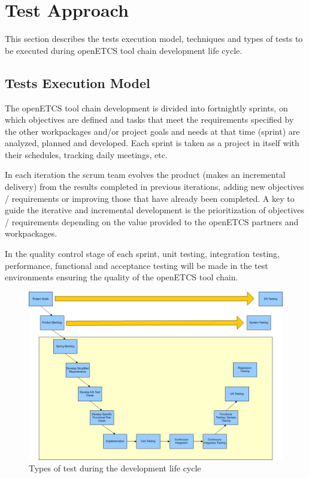 \section{Test Approach}
\label{sec:test_stra}

This section describes the tests execution model, techniques and types of tests to be executed during openETCS tool chain development life cycle.

\subsection{Tests Execution Model}
The openETCS tool chain development is divided into  fortnightly sprints, on which objectives are defined and tasks that meet the requirements specified by the other workpackages and/or project goals and needs at that time (sprint) are analyzed, planned and developed. Each sprint is taken as a project in itself with their schedules, tracking daily meetings, etc.

In each iteration the scrum team evolves the product (makes an incremental delivery) from the results completed in previous iterations, adding new objectives / requirements or improving those that have already been completed. A key to guide the iterative and incremental development is the prioritization of objectives / requirements depending on the value provided to the openETCS partners and workpackages.

In the quality control stage of each sprint, unit testing, integration testing, performance, functional and acceptance testing will be made in the test environments ensuring the quality of the openETCS tool chain.

\begin{figure}[H]
\includegraphics[width=\textwidth]{types_test}
\caption{\label{fig:types} Types of test during the development life cycle} 
\end{figure}


